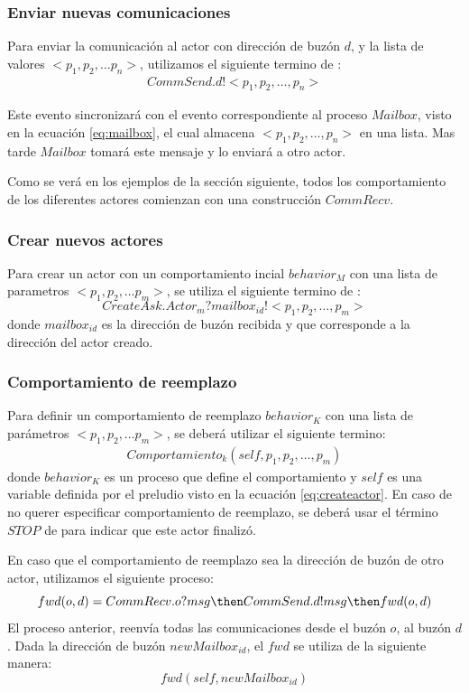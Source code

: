 \subsubsection*{Enviar nuevas comunicaciones}
 Para enviar la comunicación al actor con dirección de buzón $d$, y la lista de valores $<p_1, p_2, \ldots p_n>$, utilizamos el siguiente termino de \CSP:
\begin{align*}
CommSend.d!<p_1, p_2, \ldots, p_n> 
\end{align*}

Este evento sincronizará con el evento correspondiente al proceso $Mailbox$, visto en la ecuación \eqref{eq:mailbox}, el cual almacena $<p_1, p_2, \ldots, p_n>$ en una lista. Mas tarde $Mailbox$ tomará este mensaje y lo enviará a otro actor. 

Como se verá en los ejemplos de la sección siguiente, todos los comportamiento de los diferentes actores comienzan con una construcción $CommRecv$.

\subsubsection*{Crear nuevos actores}
Para crear un actor con un comportamiento incial $behavior_M$ con una lista de parametros $<p_1, p_2, \ldots p_m>$, se utiliza el siguiente termino de \CSP: 
\begin{equation*}
CreateAsk.Actor_m?mailbox_{id}!<p_1, p_2, \ldots, p_m> 
\end{equation*}	
donde $mailbox_{id}$ es la dirección de buzón recibida y que corresponde a la dirección del actor creado.

\subsubsection*{Comportamiento de reemplazo}
Para definir un comportamiento de reemplazo $behavior_K$ con una lista de parámetros $<p_1, p_2, \ldots p_m>$, se deberá utilizar el siguiente termino: 
\begin{align*}
Comportamiento_k(self, p_1, p_2, \ldots, p_m) 
\end{align*}	
donde $behavior_K$ es un proceso \CSP que define el comportamiento y $self$ es una variable definida por el preludio visto en la ecuación \eqref{eq:createactor}.
En caso de no querer especificar comportamiento de reemplazo, se deberá usar el término $STOP$ de \CSP para indicar que este actor finalizó.

En caso que el comportamiento de reemplazo sea la dirección de buzón de otro actor, utilizamos   el siguiente proceso:
\begin{equation*}
  fwd(o, d) = CommRecv.o?msg \then CommSend.d!msg \then fwd(o, d)
\end{equation*}
El proceso anterior, reenvía todas las comunicaciones desde el buzón $o$, al buzón $d$. Dada la dirección de buzón $newMailbox_{id}$, el $fwd$ se utiliza de la siguiente manera:
\begin{equation*}
  fwd(self, newMailbox_{id})
\end{equation*}


